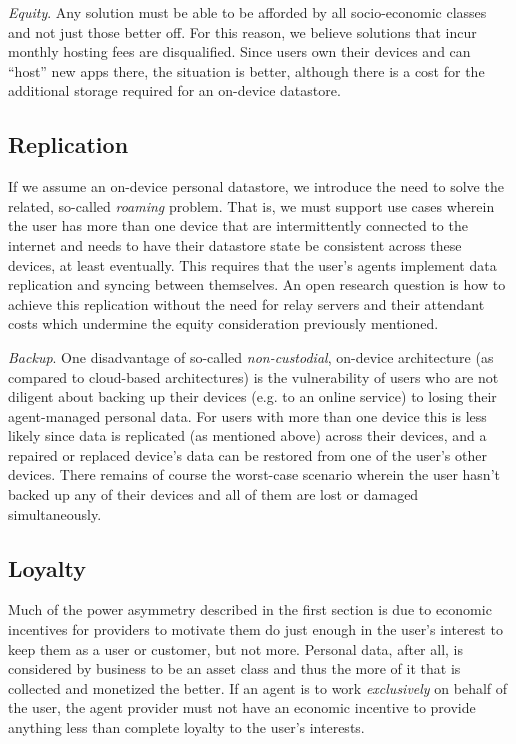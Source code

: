 \documentclass[11pt, oneside]{article}   	%
\begin{document}
\emph{Equity}. Any solution must be able to be afforded by all socio-economic classes and not just those better off. For this reason, we believe solutions that incur monthly hosting fees are disqualified. Since users own their devices and can ``host'' new apps there, the situation is better, although there is a cost for the additional storage required for an on-device datastore.

\subsection{Replication}

If we assume an on-device personal datastore, we introduce the need to solve the related, so-called \emph{roaming} problem. That is, we must support use cases wherein the user has more than one device that are intermittently connected to the internet and needs to have their datastore state be consistent across these devices, at least eventually. This requires that the user's agents implement data replication and syncing between themselves. An open research question is how to achieve this replication without the need for relay servers and their attendant costs which undermine the equity consideration previously mentioned.

\emph{Backup}. One disadvantage of so-called \emph{non-custodial}, on-device architecture (as compared to cloud-based architectures) is the vulnerability of users who are not diligent about backing up their devices (e.g. to an online service) to losing their agent-managed personal data. For users with more than one device this is less likely since data is replicated (as mentioned above) across their devices, and a repaired or replaced device's data can be restored from one of the user's other devices. There remains of course the worst-case scenario wherein the user hasn't backed up any of their devices and all of them are lost or damaged simultaneously. 

\subsection{Loyalty}

Much of the power asymmetry described in the first section is due to economic incentives for providers to motivate them do just enough in the user's interest to keep them as a user or customer, but not more. Personal data, after all, is considered by business to be an asset class and thus the more of it that is collected and monetized the better. If an agent is to work \emph{exclusively} on behalf of the user, the agent provider must not have an economic incentive to provide anything less than complete loyalty to the user's interests. 
\end{document}
